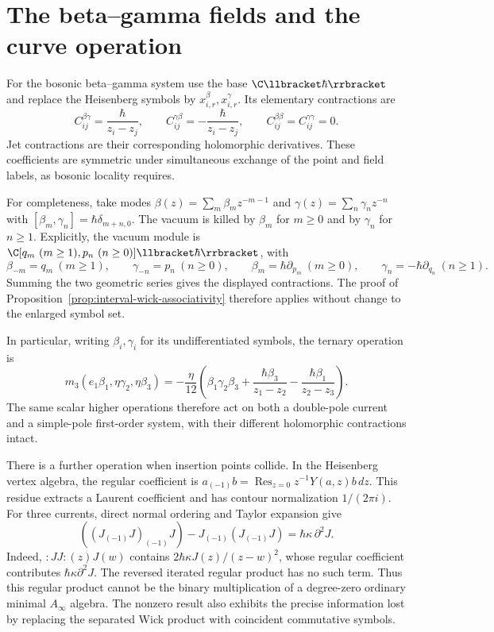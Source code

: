 \section{The beta--gamma fields and the curve operation}

For the bosonic beta--gamma system use the base $\C\llbracket\hbar\rrbracket$
and replace the Heisenberg symbols by
$x_{i,r}^{\beta},x_{i,r}^{\gamma}$.  Its elementary contractions are
\[
 C_{ij}^{\beta\gamma}=\frac{\hbar}{z_i-z_j},\qquad
 C_{ij}^{\gamma\beta}=-\frac{\hbar}{z_i-z_j},\qquad
 C_{ij}^{\beta\beta}=C_{ij}^{\gamma\gamma}=0.
\]
Jet contractions are their corresponding holomorphic derivatives.
These coefficients are symmetric under simultaneous exchange of the
point and field labels, as bosonic locality requires.

For completeness, take modes
$\beta(z)=\sum_m\beta_mz^{-m-1}$ and
$\gamma(z)=\sum_n\gamma_nz^{-n}$ with
$[\beta_m,\gamma_n]=\hbar\delta_{m+n,0}$.
The vacuum is killed by $\beta_m$ for $m\ge0$ and by $\gamma_n$
for $n\ge1$.  Explicitly, the vacuum module is
$\C[q_m\ (m\ge1),p_n\ (n\ge0)]\llbracket\hbar\rrbracket$, with
\[
 \beta_{-m}=q_m\ (m\ge1),\qquad
 \gamma_{-n}=p_n\ (n\ge0),\qquad
 \beta_m=\hbar\partial_{p_m}\ (m\ge0),\qquad
 \gamma_n=-\hbar\partial_{q_n}\ (n\ge1).
\]
Summing the two geometric series gives the displayed contractions.
The proof of Proposition~\ref{prop:interval-wick-associativity}
therefore applies without change to the enlarged symbol set.

In particular, writing $\beta_i,\gamma_i$ for its undifferentiated
symbols, the ternary operation is
\[
 m_3(e_1\beta_1,\eta\gamma_2,\eta\beta_3)
 =-\frac{\eta}{12}\left(
 \beta_1\gamma_2\beta_3+
 \frac{\hbar\beta_3}{z_1-z_2}
 -\frac{\hbar\beta_1}{z_2-z_3}\right).
\]
The same scalar higher operations therefore act on both a double-pole
current and a simple-pole first-order system, with their different
holomorphic contractions intact.

There is a further operation when insertion points collide.  In the
Heisenberg vertex algebra, the regular coefficient is
$a_{(-1)}b=\operatorname{Res}_{z=0}z^{-1}Y(a,z)b\,dz$.
This residue extracts a Laurent coefficient and has contour
normalization $1/(2\pi i)$.  For three currents, direct normal ordering
and Taylor expansion give
\[
 ((J_{(-1)}J)_{(-1)}J)-J_{(-1)}(J_{(-1)}J)
 =\hbar\kappa\,\partial^2J.
\]
Indeed, $:JJ:(z)J(w)$ contains
$2\hbar\kappa J(z)/(z-w)^2$, whose regular coefficient contributes
$\hbar\kappa\partial^2J$.  The reversed iterated regular product
has no such term.  Thus this regular product cannot be the binary
multiplication of a degree-zero ordinary minimal $A_\infty$ algebra.
The nonzero result also exhibits the precise information lost by
replacing the separated Wick product with coincident commutative symbols.

